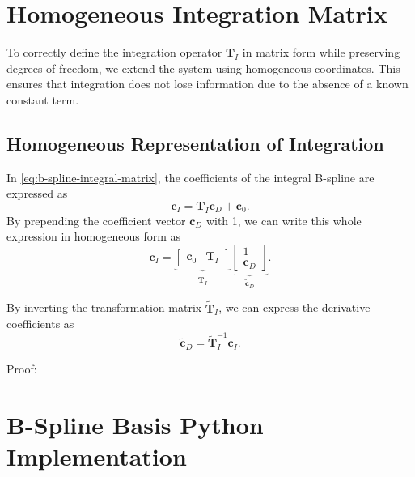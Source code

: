 

\chapter{Homogeneous Integration Matrix}\label{app:homogeneous-integration-matrix}

To correctly define the integration operator $\mathbf{T}_I$ in matrix form while preserving degrees of freedom, we extend the system using homogeneous coordinates. This ensures that integration does not lose information due to the absence of a known constant term.

\section{Homogeneous Representation of Integration}

In \cref{eq:b-spline-integral-matrix}, the coefficients of the integral B-spline are expressed as
\begin{equation}
    \mathbf{c}_I = \mathbf T_I \mathbf{c}_D + \mathbf{c}_0.
\end{equation}
By prepending the coefficient vector $\mathbf{c}_D$ with 1, we can write this whole expression in homogeneous form as
\begin{equation}
    \mathbf{c}_I = 
    \underbrace{
        \begin{bmatrix}
            \mathbf{c}_0 & \mathbf T_I
        \end{bmatrix} 
    } _{\mathbf{\tilde T}_I}
    \underbrace{
        \begin{bmatrix}
            1 \\
            \mathbf{c}_D
        \end{bmatrix}
    }_{\mathbf{\tilde c}_D}.
\end{equation}

By inverting the transformation matrix $\mathbf{\tilde T}_I$, we can express the derivative coefficients as
\begin{equation}
    \mathbf{\tilde c}_D = \mathbf{\tilde T}_I^{-1} \mathbf{c}_I.
\end{equation}

Proof:


\chapter{B-Spline Basis Python Implementation}\label{app:b-spline-python-implementation}


